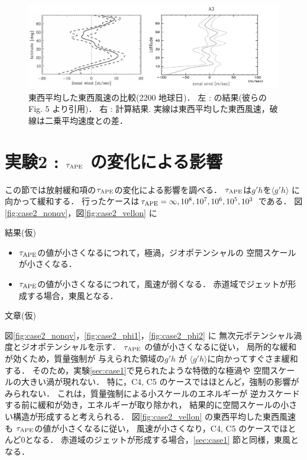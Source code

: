 \documentclass[a4j,12pt,openbib,oneside]{jreport}
\begin{document}
%
\begin{figure}[ht]
  \begin{center}
    \includegraphics[clip,width=14cm]{./fig/result/case1/case1_rms_comp.png}
    \caption{
      \footnotesize{東西平均した東西風速の比較(2200 地球日)．
左 : \cite{Showman2007} の結果(彼らのFig. 5 より引用)．
右 : 計算結果.
実線は東西平均した東西風速，破線は二乗平均速度との差．
      }
    }
    \label{fig:case1_rms_comp}
  \end{center}
\end{figure}
%
%
\clearpage
\newpage
\section{実験2 : $\tau_{\rm{APE}}$ の変化による影響}
\label{sec:case2}
この節では放射緩和項の$\tau_{\rm{APE}}$の変化による影響を調べる．
$\tau_{\rm{APE}}$は$g'h$を$\langle g'h \rangle $ に向かって緩和する．
行ったケースは$\tau_{\rm{APE}} = \infty, 10^8, 10^7, 10^6, 10^5, 10^3$ である．
図\ref{fig:case2_nonqv}，図\ref{fig:case2_vellon} に

結果(仮)
\begin{itemize}
\item{$\tau_{\rm{APE}}$の値が小さくなるにつれて，極渦，ジオポテンシャルの
空間スケールが小さくなる．}
\item{$\tau_{\rm{APE}}$の値が小さくなるにつれて，風速が弱くなる．
赤道域でジェットが形成する場合，東風となる．}
\end{itemize}
%

文章(仮) 

図\ref{fig:case2_nonqv}，\ref{fig:case2_phi1}，\ref{fig:case2_phi2} に
無次元ポテンシャル渦度とジオポテンシャルを示す．
%
$\tau_{\rm{APE}}$ の値が小さくなるに従い，
局所的な緩和が効くため，質量強制が
与えられた領域の$g'h$ が $\langle g'h \rangle$に向かってすぐさま緩和する．
そのため，実験\ref{sec:case1}で見られたような特徴的な極渦や
空間スケールの大きい渦が現れない．
特に，C4, C5 のケースではほとんど，強制の影響がみられない．
%
これは，質量強制による小スケールのエネルギーが
逆カスケードする前に緩和が効き，エネルギーが取り除かれ，
結果的に空間スケールの小さい構造が形成すると考えられる．
%
図\ref{fig:case2_vellon} の東西平均した東西風速も
$\tau_{\rm{APE}}$の値が小さくなるに従い，
風速が小さくなり，C4, C5 のケースでほとんど0となる．
赤道域のジェットが形成する場合，\ref{sec:case1} 節と同様，東風となる．
%
\end{document}
